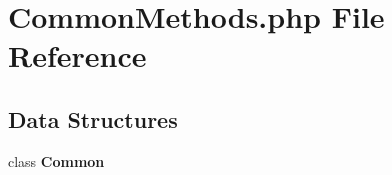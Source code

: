 \section{Common\+Methods.\+php File Reference}
\label{_common_methods_8php}
\subsection*{Data Structures}
\begin{DoxyCompactItemize}
\item 
class {\bf Common}
\end{DoxyCompactItemize}
